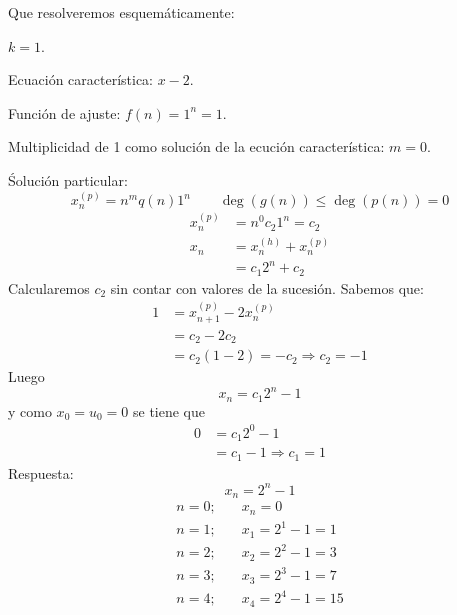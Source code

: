 \begin{ejercicio}
    Que resolveremos esquemáticamente:
    \begin{description}
        \item $k = 1$.
        \item Ecuación característica: $x-2$.
        \item Función de ajuste: $f(n) = 1^n = 1$.
        \item Multiplicidad de 1 como solución de la ecución característica: $m = 0$.
    \end{description}
    Śolución particular:
    \begin{equation*}
        x_n^{(p)} = n^m q(n)1^n \qquad \deg(g(n)) \leq \deg(p(n)) = 0
    \end{equation*}
    \begin{align*}
        x_n^{(p)} &= n^0 c_2 1^n = c_2 \\
        x_n &= x_n^{(h)} + x_n^{(p)} \\
            &= c_1 2^n + c_2 
    \end{align*}
    Calcularemos $c_2$ sin contar con valores de la sucesión. Sabemos que:
    \begin{align*}
        1 &= x_{n+1}^{(p)} - 2x_n^{(p)} \\
          &= c_2 - 2 c_2 \\
          &= c_2 (1-2) = -c_2 \Longrightarrow c_2 = -1
    \end{align*}
    Luego 
    \begin{equation*}
        x_n = c_1 2^n - 1
    \end{equation*}
    y como $x_0 = u_0 = 0$ se tiene que
    \begin{align*}
        0 &= c_1 2^0 - 1 \\
          &= c_1 - 1 \Longrightarrow c_1 = 1
    \end{align*}
    Respuesta:
    \begin{equation*}
        x_n = 2^n -1
    \end{equation*}
    \begin{align*}
        n = 0;& \quad x_n = 0 \\
        n = 1;& \quad x_1 = 2^1 - 1 = 1 \\
        n = 2;& \quad x_2 = 2^2 - 1 = 3 \\
        n = 3;& \quad x_3 = 2^3 - 1 = 7 \\
        n = 4;& \quad x_4 = 2^4 - 1 = 15
    \end{align*}
\end{ejercicio}


